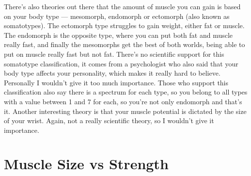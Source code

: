 \documentclass[openany, 12pt]{book}
\begin{document}
        There's also theories out there that the amount of muscle you can gain is based on your body type ---
        mesomorph, endomorph or ectomorph (also known as somatotypes). The ectomorph type struggles to gain weight, either fat or muscle.
        The endomorph is the opposite type, where you can put both fat and muscle really fast, and finally the mesomorphs get the best of both worlds, being able to put on muscle really fast
        but not fat. There's no scientific support for this somatotype classification, it comes from a psychologist who also said that your body type affects your personality, which makes it
        really hard to believe. Personally I wouldn't give it too much importance. Those who support this classification also say there is a spectrum for each type, so you belong to all types
        with a value between 1 and 7 for each, so you're not only endomorph and that's it. Another interesting theory is that your muscle potential is dictated by the size of your wrist.
        Again, not a really scientific theory, so I wouldn't give it importance.

        \section{Muscle Size vs Strength}
\end{document}
